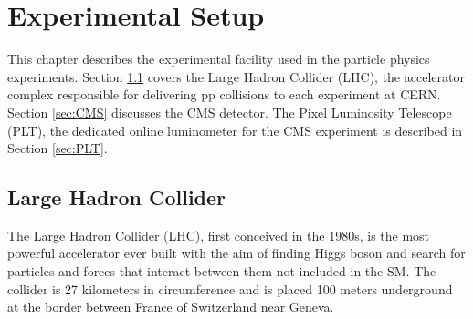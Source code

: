 \chapter{Experimental Setup} \label{ch:expSetup}

This chapter describes the experimental facility used in the particle physics experiments. Section
\ref{sec:LHC} covers the Large Hadron Collider (LHC), the accelerator complex responsible for delivering pp collisions to each experiment at CERN. Section \ref{sec:CMS} discusses the CMS detector. The Pixel Luminosity Telescope (PLT), the dedicated online luminometer for the CMS experiment is described in Section \ref{sec:PLT}.

\section{Large Hadron Collider} \label{sec:LHC}

The Large Hadron Collider (LHC), first conceived in the 1980s, is the most powerful accelerator ever built with the aim of finding Higgs boson and search for particles and forces that interact between them not included in the SM. The collider is 27 kilometers in circumference and is placed 100 meters underground at the border between France of Switzerland near Geneva. 




